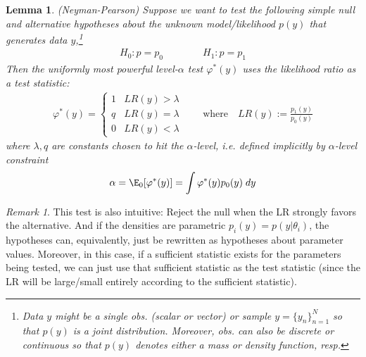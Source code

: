 \documentclass[12pt]{article}
\theoremstyle{plain}
\newtheorem{lem}[thm]{Lemma}
\theoremstyle{definition}
\theoremstyle{remark}
\newtheorem*{rmk}{Remark}
\newcommand{\nN}{_{n=1}^N}
\begin{document}
\begin{lem}\emph{(Neyman-Pearson)}
Suppose we want to test the following simple null and alternative
hypotheses about the unknown model/likelihood $p(y)$ that generates
data $y$,\footnote{%
  Data $y$ might be a single obs. (scalar or vector) or
  sample $y=\{y_n\}\nN$ so that $p(y)$ is a \emph{joint}
  distribution. Moreover, obs. can also be discrete or
  continuous so that $p(y)$ denotes either a mass or density
  function, resp.
}
\begin{align*}
  H_0: p=p_0
  \qquad\qquad
  H_1: p=p_1
\end{align*}
Then the uniformly most powerful level-$\alpha$ test $\varphi^*(y)$
uses the likelihood ratio as a test statistic:
\begin{align}
  \varphi^*(y)
  =
  \begin{cases}
    1 & LR(y) > \lambda \\
    q & LR(y) = \lambda \\
    0 & LR(y) < \lambda
  \end{cases}
  \qquad \text{where}\quad
  LR(y) := \frac{p_1(y)}{p_0(y)}
  \label{neymantest}
\end{align}
where $\lambda,q$ are constants chosen to hit the $\alpha$-level, i.e.
defined implicitly by $\alpha$-level constraint
\begin{align}
  \alpha
  = \E_0[\varphi^*(y)]
  = \int \varphi^*(y) p_0(y)\; dy
  \label{neymanalpha}
\end{align}
\end{lem}
\begin{rmk}
This test is also intuitive:
Reject the null when the LR strongly favors the alternative.  And if the
densities are parametric $p_i(y)=p(y|\theta_i)$, the hypotheses
can, equivalently, just be rewritten as hypotheses about parameter
values. Moreover, in this case, if a sufficient statistic exists for the
parameters being tested, we can just use that sufficient statistic as
the test statistic (since the LR will be large/small entirely according
to the sufficient statistic).
\end{rmk}
\end{document}
